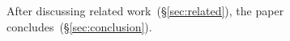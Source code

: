 After discussing related work~(\S\ref{sec:related}),
the paper concludes~(\S\ref{sec:conclusion}).

